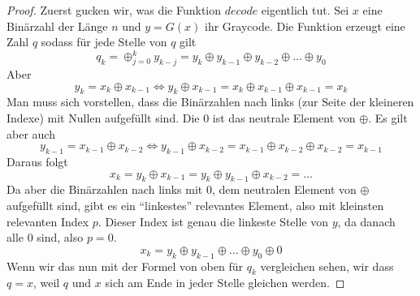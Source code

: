 \documentclass[a4paper,10pt]{article}
\begin{document}
\begin{proof}
 Zuerst gucken wir, was die Funktion $decode$ eigentlich tut.
 Sei $x$ eine Binärzahl der Länge $n$ und $y = G(x)$ ihr Graycode.
 Die Funktion erzeugt eine Zahl $q$ sodass für jede Stelle von $q$ gilt
 \begin{equation}
  q_k = \oplus_{j = 0}^k y_{k - j} = y_k \oplus y_{k - 1} \oplus y_{k - 2} \oplus \dots \oplus y_0
 \end{equation}
 Aber
 \begin{equation}
  y_k = x_k \oplus x_{k - 1} \Leftrightarrow y_k \oplus x_{k - 1} = x_k \oplus x_{k - 1} \oplus x_{k - 1} = x_k
 \end{equation}
 Man muss sich vorstellen, dass die Binärzahlen nach links (zur Seite der kleineren Indexe) mit Nullen aufgefüllt sind.
 Die $0$ ist das neutrale Element von $\oplus$.
 Es gilt aber auch
 \begin{equation}
  y_{k - 1} = x_{k - 1} \oplus x_{k - 2} \Leftrightarrow y_{k - 1} \oplus x_{k - 2} = x_{k - 1} \oplus x_{k - 2} \oplus x_{k - 2} = x_{k - 1}
 \end{equation}
 Daraus folgt
 \begin{equation}
  x_k = y_k \oplus x_{k - 1} = y_k \oplus y_{k - 1} \oplus x_{k - 2} = \dots
 \end{equation}
 Da aber die Binärzahlen nach links mit $0$, dem neutralen Element von $\oplus$ aufgefüllt sind, gibt es ein ``linkestes'' relevantes Element, also mit kleinsten relevanten Index $p$.
 Dieser Index ist genau die linkeste Stelle von $y$, da danach alle $0$ sind, also $p = 0$.
 \begin{equation}
  x_k = y_k \oplus y_{k - 1} \oplus \dots \oplus y_0 \oplus 0
 \end{equation}
 Wenn wir das nun mit der Formel von oben für $q_k$ vergleichen sehen, wir dass $q = x$, weil $q$ und $x$ sich am Ende in jeder Stelle gleichen werden.
\end{proof}
\end{document}
